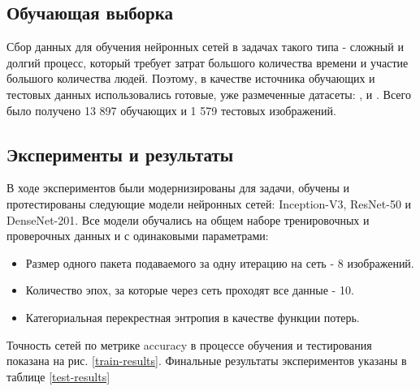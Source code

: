 
\subsection{Обучающая выборка}
Сбор данных для обучения нейронных сетей в задачах такого типа - сложный и долгий процесс, который требует затрат большого количества времени и участие большого количества людей. Поэтому, в качестве источника обучающих и тестовых данных использовались готовые, уже размеченные датасеты: \cite{tawsifurrahman}, \cite{cohen2020covid} и \cite{wang2020covidnet}. 
Всего было получено 13 897 обучающих и 1 579 тестовых изображений.

% 


\subsection{Эксперименты и результаты}
В ходе экспериментов были модернизированы для задачи, обучены и протестированы следующие модели нейронных сетей: Inception-V3, ResNet-50 и DenseNet-201. Все модели обучались на общем наборе тренировочных и проверочных данных и с одинаковыми параметрами:
\begin{itemize}
    \item Размер одного пакета подаваемого за одну итерацию на сеть - 8 изображений.
    \item Количество эпох, за которые через сеть проходят все данные - 10.
    \item Категориальная перекрестная энтропия в качестве функции потерь.
\end{itemize}
Точность сетей по метрике accuracy в процессе обучения и тестирования показана на рис. \ref{train-results}. Финальные результаты экспериментов указаны в таблице \ref{test-results}




\clearpage